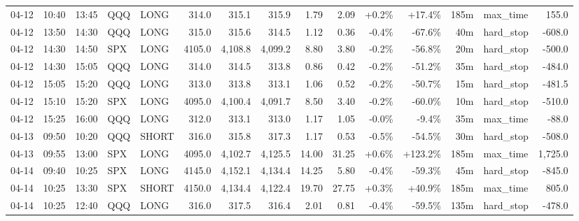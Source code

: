 \documentclass[11pt,a4paper,twoside]{article}
\begin{document}
\begin{landscape}
\begin{center}
\begin{longtable}{>{\color{txtmain}}l l l l l r r r r r r r r >{\color{txtmain}}l r}
04-12 & 10:40 & 13:45 & QQQ & LONG & 314.0 & 315.1 & 315.9 & 1.79 & 2.09 & \textcolor{wingreen}{+0.2\%} & \textcolor{wingreen}{+17.4\%} & 185m & max\_time & \textcolor{wingreen}{155.0} \\
04-12 & 13:50 & 14:30 & QQQ & LONG & 315.0 & 315.6 & 314.5 & 1.12 & 0.36 & \textcolor{lossred}{-0.4\%} & \textcolor{lossred}{-67.6\%} & 40m & hard\_stop & \textcolor{lossred}{-608.0} \\
04-12 & 14:30 & 14:50 & SPX & LONG & 4105.0 & 4,108.8 & 4,099.2 & 8.80 & 3.80 & \textcolor{lossred}{-0.2\%} & \textcolor{lossred}{-56.8\%} & 20m & hard\_stop & \textcolor{lossred}{-500.0} \\
04-12 & 14:30 & 15:05 & QQQ & LONG & 314.0 & 314.5 & 313.8 & 0.86 & 0.42 & \textcolor{lossred}{-0.2\%} & \textcolor{lossred}{-51.2\%} & 35m & hard\_stop & \textcolor{lossred}{-484.0} \\
04-12 & 15:05 & 15:20 & QQQ & LONG & 313.0 & 313.8 & 313.1 & 1.06 & 0.52 & \textcolor{lossred}{-0.2\%} & \textcolor{lossred}{-50.7\%} & 15m & hard\_stop & \textcolor{lossred}{-481.5} \\
04-12 & 15:10 & 15:20 & SPX & LONG & 4095.0 & 4,100.4 & 4,091.7 & 8.50 & 3.40 & \textcolor{lossred}{-0.2\%} & \textcolor{lossred}{-60.0\%} & 10m & hard\_stop & \textcolor{lossred}{-510.0} \\
04-12 & 15:25 & 16:00 & QQQ & LONG & 312.0 & 313.1 & 313.0 & 1.17 & 1.05 & \textcolor{lossred}{-0.0\%} & \textcolor{lossred}{-9.4\%} & 35m & max\_time & \textcolor{lossred}{-88.0} \\
04-13 & 09:50 & 10:20 & QQQ & SHORT & 316.0 & 315.8 & 317.3 & 1.17 & 0.53 & \textcolor{lossred}{-0.5\%} & \textcolor{lossred}{-54.5\%} & 30m & hard\_stop & \textcolor{lossred}{-508.0} \\
04-13 & 09:55 & 13:00 & SPX & LONG & 4095.0 & 4,102.7 & 4,125.5 & 14.00 & 31.25 & \textcolor{wingreen}{+0.6\%} & \textcolor{wingreen}{+123.2\%} & 185m & max\_time & \textcolor{wingreen}{1,725.0} \\
04-14 & 09:40 & 10:25 & SPX & LONG & 4145.0 & 4,152.1 & 4,134.4 & 14.25 & 5.80 & \textcolor{lossred}{-0.4\%} & \textcolor{lossred}{-59.3\%} & 45m & hard\_stop & \textcolor{lossred}{-845.0} \\
04-14 & 10:25 & 13:30 & SPX & SHORT & 4150.0 & 4,134.4 & 4,122.4 & 19.70 & 27.75 & \textcolor{wingreen}{+0.3\%} & \textcolor{wingreen}{+40.9\%} & 185m & max\_time & \textcolor{wingreen}{805.0} \\
04-14 & 10:25 & 12:40 & QQQ & LONG & 316.0 & 317.5 & 316.4 & 2.01 & 0.81 & \textcolor{lossred}{-0.4\%} & \textcolor{lossred}{-59.5\%} & 135m & hard\_stop & \textcolor{lossred}{-478.0} \\

\end{longtable}
\end{center}
\end{landscape}
\end{document}
